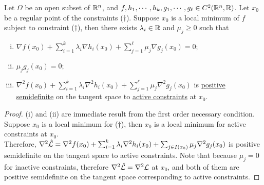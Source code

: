 \documentclass{article}
\begin{document}
	\begin{theorem}
		Let $\Omega$ be an open subset of $\mathbb{R}^n$, and $f, h_1, \cdots, h_k, g_1, \cdots, g_\ell \in C^2(\mathbb{R}^n, \mathbb{R})$. Let $x_0$ be a regular point of the constraints ($\dag$).
		Suppose $x_0$ is a local minimum of $f$ subject to constraint ($\dag$), then there exists $\lambda_i \in \mathbb{R}$ and $\mu_j \geq 0$ such that
		\begin{enumerate}[(i)]
			\item $\nabla f(x_0) + \sum_{i=1}^k \lambda_i \nabla h_i(x_0) + \sum_{j=1}^\ell \mu_j \nabla g_j(x_0) = 0$;
			\item $\mu_j g_j(x_0) = 0$;
			\item $\nabla^2 f(x_0) + \sum_{i=1}^k \lambda_i \nabla^2 h_i(x_0) + \sum_{j=1}^\ell \mu_j \nabla^2 g_j(x_0)$ is \ul{positive semidefinite} on the tangent space to \ul{active constraints} at $x_0$.
		\end{enumerate}
	\end{theorem}
	\begin{proof}
		(i) and (ii) are immediate result from the first order necessary condition. \\
		Suppose $x_0$ is a local minimum for ($\dag$), then $x_0$ is a local minimum for active constraints at $x_0$. \\
		Therefore, $\nabla^2 \hat{\mathcal{{L}}} = \nabla^2 f(x_0) + \sum_{i=1}^k \lambda_i \nabla^2 h_i(x_0) + \sum_{j \in I(x_0)} \mu_j \nabla^2 g_j(x_0)$ is positive semidefinite on the tangent space to active constraints. Note that because $\mu_j = 0$ for inactive constraints, therefore $\nabla^2 \hat{\mathcal{{L}}} = \nabla^2 \mathcal{{L}}$ at $x_0$, and both of them are positive semidefinite on the tangent space corresponding to active constraints.
	\end{proof}
	
\end{document}
